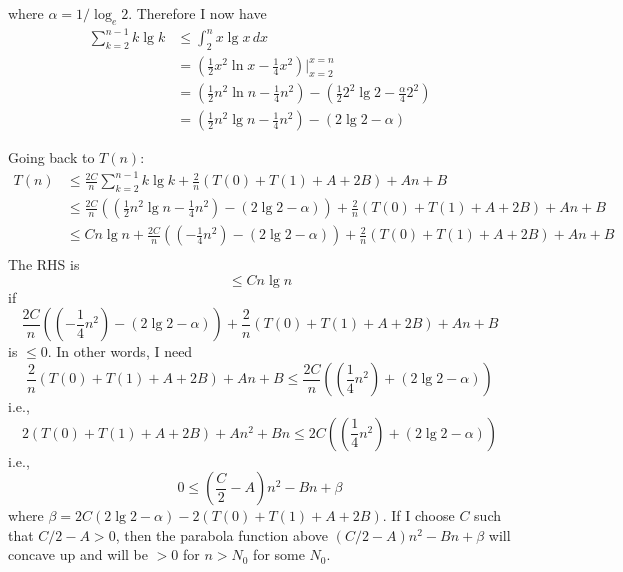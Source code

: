 where $\alpha = 1/\log_e 2$.
Therefore I now have
\begin{align*}
  \sum_{k = 2}^{n - 1} k \lg k
  &\leq
    \int_{2}^n x \lg x \, dx
  \\
  &= \left( \frac{1}{2}x^2 \ln x - \frac{1}{4}x^2 \right)\biggl|_{x=2}^{x=n}
  \\
  &=
    \left( \frac{1}{2}n^2 \ln n - \frac{1}{4}n^2 \right)
    -
    \left( \frac{1}{2}2^2 \lg 2 - \frac{\alpha}{4}2^2 \right) 
  \\
  &=
    \left( \frac{1}{2}n^2 \lg n - \frac{1}{4}n^2 \right)
    -
    \left( 2 \lg 2 - \alpha \right) 
\end{align*}

Going back to $T(n)$:
\begin{align*}
  T(n)
  &\leq
    \frac{2C}{n} \sum_{k = 2}^{n - 1} k \lg k
    + \frac{2}{n}
    \left( T(0) + T(1) + A + 2B \right)
    +
    An + B
  \\
  &\leq
    \frac{2C}{n}
    \left(
        \left( \frac{1}{2}n^2 \lg n - \frac{1}{4}n^2 \right)
    -
    \left( 2 \lg 2 - \alpha \right) 
    \right)
    + \frac{2}{n}
    \left( T(0) + T(1) + A + 2B \right)
    +
    An + B
  \\
  &\leq
    C n \lg n
    + 
    \frac{2C}{n}
    \left(
        \left( - \frac{1}{4}n^2 \right)
    -
    \left( 2 \lg 2 - \alpha \right) 
    \right)
    + \frac{2}{n}
    \left( T(0) + T(1) + A + 2B \right)
    +
    An + B
  \\
\end{align*}
The RHS is
\[
  \leq C n \lg n 
\]
if
\[
  \frac{2C}{n}
    \left(
        \left( - \frac{1}{4}n^2 \right)
    -
    \left( 2 \lg 2 - \alpha \right) 
    \right)
    + \frac{2}{n}
    \left( T(0) + T(1) + A + 2B \right)
    +
    An + B
\]
is $\leq 0$.
In other words, I need
\[
    \frac{2}{n}
    \left( T(0) + T(1) + A + 2B \right)
    +
    An + B
    \leq
    \frac{2C}{n}
    \left(
        \left(\frac{1}{4}n^2 \right)
    +
    \left( 2 \lg 2 - \alpha \right) 
  \right)
\]
i.e.,
\[
    {2}
    \left( T(0) + T(1) + A + 2B \right)
    +
    An^2 + Bn
    \leq
    2C
    \left(
        \left(\frac{1}{4}n^2 \right)
    +
    \left( 2 \lg 2 - \alpha \right) 
  \right)
\]
i.e.,
\[
  0
  \leq
  \left(\frac{C}{2} - A \right) n^2
  - Bn
  +
  \beta
\]
where
$\beta = 2C(2 \lg 2 - \alpha)
- 2 \left( T(0) + T(1) + A + 2B \right)$.
If I choose $C$ such that
$C/2 - A > 0$, then the parabola
function above $(C/2 - A)n^2 - Bn + \beta$
will concave up and
will be $> 0$ for $n > N_0$ for some $N_0$.

